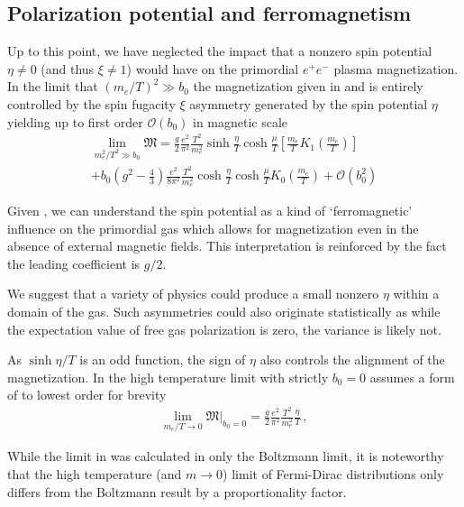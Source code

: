 \subsection{Polarization potential and ferromagnetism}
\label{sec:ferro}
\noindent Up to this point, we have neglected the impact that a nonzero spin potential $\eta\neq0$ (and thus $\xi\neq1$) would have on the primordial $e^{+}e^{-}$ plasma magnetization. In the limit that $(m_{e}/T)^2\gg b_0$ the magnetization given in  and  is entirely controlled by the spin fugacity $\xi$ asymmetry generated by the spin potential $\eta$ yielding up to first order $\mathcal{O}(b_{0})$ in magnetic scale
\begin{multline}
 \label{ferro}
 \lim_{m_{e}^{2}/T^{2}\gg b_0}{\mathfrak M}=\frac{g}{2}\frac{e^{2}}{\pi^{2}}\frac{T^{2}}{m_{e}^{2}}\sinh{\frac{\eta}{T}}\cosh{\frac{\mu}{T}}\left[\frac{m_{e}}{T}K_{1}\left(\frac{m_{e}}{T}\right)\right]\\
 +b_{0}\left(g^{2}-\frac{4}{3}\right)\frac{e^{2}}{8\pi^{2}}\frac{T^{2}}{m_{e}^{2}}\cosh{\frac{\eta}{T}}\cosh{\frac{\mu}{T}}K_{0}\left(\frac{m_{e}}{T}\right)
 +\mathcal{O}\left(b_{0}^{2}\right)
\end{multline}

Given , we can understand the spin potential as a kind of `ferromagnetic' influence on the primordial gas which allows for magnetization even in the absence of external magnetic fields. This interpretation is reinforced by the fact the leading coefficient is $g/2$.

We suggest that a variety of physics could produce a small nonzero $\eta$ within a domain of the gas. Such asymmetries could also originate statistically as while the expectation value of free gas polarization is zero, the variance is likely not.

As $\sinh{\eta/T}$ is an odd function, the sign of $\eta$ also controls the alignment of the magnetization. In the high temperature limit  with strictly $b_{0}=0$ assumes a form of to lowest order for brevity
\begin{align}
 \label{hiTferro}
 \lim_{m_{e}/T\rightarrow0}{\mathfrak M}\vert_{b_{0}=0}=\frac{g}{2}\frac{e^{2}}{\pi^{2}}\frac{T^{2}}{m_{e}^{2}}\frac{\eta}{T}\,,
\end{align}

While the limit in  was calculated in only the Boltzmann limit, it is noteworthy that the high temperature (and $m\rightarrow0$) limit of Fermi-Dirac distributions only differs from the Boltzmann result by a proportionality factor. 

